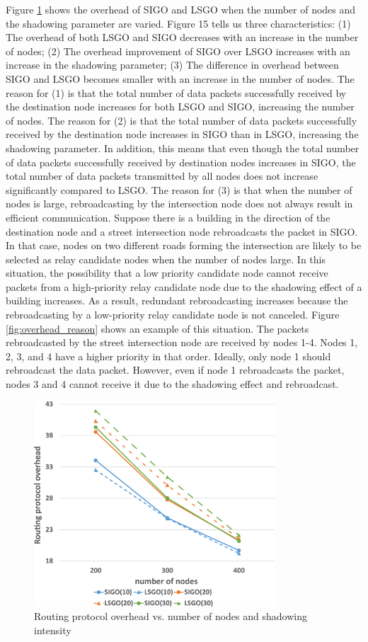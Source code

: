 \documentclass[conference]{IEEEtran}
\begin{document}
Figure \ref{fig:overhead} shows the overhead of SIGO and LSGO when the number of nodes and the shadowing parameter are varied. Figure 15 tells us three characteristics: (1) The overhead of both LSGO and SIGO decreases with an increase in the number of nodes; (2) The overhead improvement of SIGO over LSGO increases with an increase in the shadowing parameter; (3) The diﬀerence in overhead between SIGO and LSGO becomes smaller with an increase in the number of nodes. The reason for (1) is that the total number of data packets successfully received by the destination node increases for both LSGO and SIGO, increasing the number of nodes. The reason for (2) is that the total number of data packets successfully received by the destination node increases in SIGO than in LSGO, increasing the shadowing parameter. In addition, this means that even though the total number of data packets successfully received by destination nodes increases in SIGO, the total number of data packets transmitted by all nodes does not increase signiﬁcantly compared to LSGO. The reason for (3) is that when the number of nodes is large, rebroadcasting by the intersection node does not always result in efficient communication. Suppose there is a building in the direction of the destination node and a street intersection node rebroadcasts the packet in SIGO. In that case, nodes on two different roads forming the intersection are likely to be selected as relay candidate nodes when the number of nodes large. In this situation, the possibility that a low priority candidate node cannot receive packets from a high-priority relay candidate node due to the shadowing effect of a building increases. As a result, redundant rebroadcasting increases because the rebroadcasting by a low-priority relay candidate node is not canceled. Figure \ref{fig:overhead_reason} shows an example of this situation. The packets rebroadcasted by the street intersection node are received by nodes 1-4. Nodes 1, 2, 3, and 4 have a higher priority in that order. Ideally, only node 1 should rebroadcast the data packet. However, even if node 1 rebroadcasts the packet, nodes 3 and 4 cannot receive it due to the shadowing effect and rebroadcast.






\begin{figure}[!ht]
\centering
\includegraphics[width=90mm]{figures/overhead.eps}
\caption{Routing protocol overhead vs. number of nodes and shadowing intensity }
\label{fig:overhead}
\end{figure}
\end{document}
